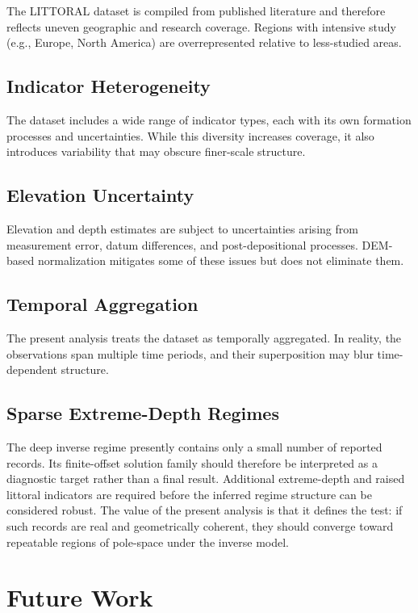 \documentclass[twocolumn,10pt]{article}
\begin{document}
The LITTORAL dataset is compiled from published literature and therefore reflects uneven geographic and research coverage. Regions with intensive study (e.g., Europe, North America) are overrepresented relative to less-studied areas.

\subsection{Indicator Heterogeneity}

The dataset includes a wide range of indicator types, each with its own formation processes and uncertainties. While this diversity increases coverage, it also introduces variability that may obscure finer-scale structure.

\subsection{Elevation Uncertainty}

Elevation and depth estimates are subject to uncertainties arising from measurement error, datum differences, and post-depositional processes. DEM-based normalization mitigates some of these issues but does not eliminate them.

\subsection{Temporal Aggregation}

The present analysis treats the dataset as temporally aggregated. In reality, the observations span multiple time periods, and their superposition may blur time-dependent structure.

\subsection{Sparse Extreme-Depth Regimes}

The deep inverse regime presently contains only a small number of reported records. Its finite-offset solution family should therefore be interpreted as a diagnostic target rather than a final result. Additional extreme-depth and raised littoral indicators are required before the inferred regime structure can be considered robust. The value of the present analysis is that it defines the test: if such records are real and geometrically coherent, they should converge toward repeatable regions of pole-space under the inverse model.

\section{Future Work}
\end{document}
